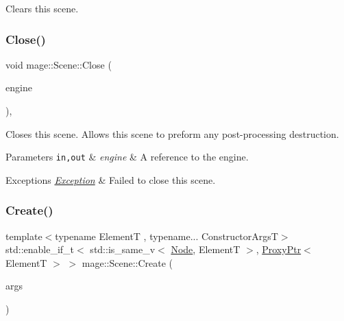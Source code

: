 Clears this scene. \mbox{\label{classmage_1_1_scene_a6b90bb51fb3b5e965a42bfa57f992803}} 
\subsubsection{\texorpdfstring{Close()}{Close()}}
{\footnotesize\ttfamily void mage\+::\+Scene\+::\+Close (\begin{DoxyParamCaption}\item[{\mbox{[}\mbox{[}maybe\+\_\+unused\mbox{]} \mbox{]} \mbox{\hyperlink{classmage_1_1_engine}{Engine}} \&}]{engine }\end{DoxyParamCaption})\hspace{0.3cm}{\ttfamily [private]}, {\ttfamily [virtual]}}

Closes this scene. Allows this scene to preform any post-\/processing destruction.


\begin{DoxyParams}[1]{Parameters}
\mbox{\tt in,out}  & {\em engine} & A reference to the engine. \\
\hline
\end{DoxyParams}

\begin{DoxyExceptions}{Exceptions}
{\em \mbox{\hyperlink{classmage_1_1_exception}{Exception}}} & Failed to close this scene. \\
\hline
\end{DoxyExceptions}
\mbox{\label{classmage_1_1_scene_a8ce3f5152ad4b0935a08cc2f0a53383c}} 
\subsubsection{\texorpdfstring{Create()}{Create()}\hspace{0.1cm}{\footnotesize\ttfamily [1/2]}}
{\footnotesize\ttfamily template$<$typename ElementT , typename... Constructor\+ArgsT$>$ \\
std\+::enable\+\_\+if\+\_\+t$<$ std\+::is\+\_\+same\+\_\+v$<$ \mbox{\hyperlink{classmage_1_1_node}{Node}}, ElementT $>$, \mbox{\hyperlink{classmage_1_1_proxy_ptr}{Proxy\+Ptr}}$<$ ElementT $>$ $>$ mage\+::\+Scene\+::\+Create (\begin{DoxyParamCaption}\item[{Constructor\+ArgsT \&\&...}]{args }\end{DoxyParamCaption})}

